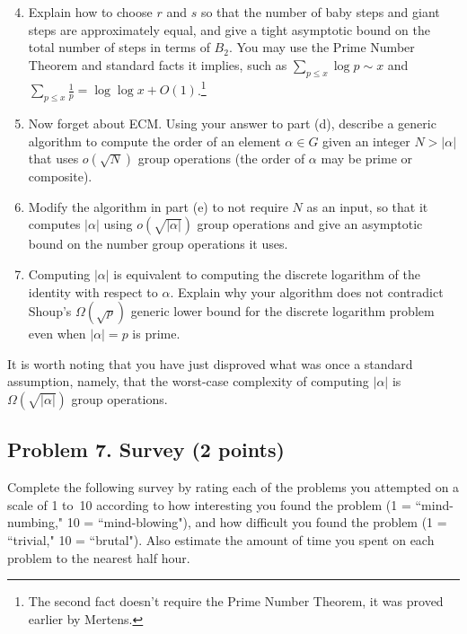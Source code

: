 \documentclass[11pt]{article}
\theoremstyle{definition}
\begin{document}
\begin{enumerate}[{\bf (a)}]
\setcounter{enumi}{3}
\item
Explain how to choose $r$ and $s$ so that the number of baby steps and giant steps are approximately equal, and give a tight asymptotic bound on the total number of steps in terms of $B_2$.  You may use the Prime Number Theorem and standard facts it implies, such as $\sum_{p\le x} \log p \sim x$ and $\sum_{p\le x}\frac{1}{p} = \log\log x + O(1)$.\footnote{The second fact doesn't require the Prime Number Theorem, it was proved earlier by Mertens.}
\item
Now forget about ECM.
Using your answer to part (d), describe a generic algorithm to compute the order of an element $\alpha\in G$ given an integer $N>|\alpha|$ that uses $o(\sqrt{N})$ group operations (the order of $\alpha$ may be prime or composite).  
\item
Modify the algorithm in part (e) to not require $N$ as an input, so that it computes $|\alpha|$ using $o(\sqrt{|\alpha|})$ group operations and give an  asymptotic bound on the number group operations it uses.
\item
Computing $|\alpha|$ is equivalent to computing the discrete logarithm of the identity with respect to $\alpha$.
Explain why your algorithm does not contradict Shoup's $\Omega(\sqrt{p})$ generic lower bound for the discrete logarithm problem even when $|\alpha|=p$ is prime.
\end{enumerate}

It is worth noting that you have just disproved what was once a standard assumption, namely, that the worst-case complexity of computing $|\alpha|$ is $\Omega(\sqrt{|\alpha|})$ group operations.


\subsection*{Problem 7. Survey (2 points)}

Complete the following survey by rating each of the problems you attempted on a scale of 1 to~10 according to how interesting you found the problem (1 = ``mind-numbing," 10 = ``mind-blowing"), and how difficult you found the problem (1 = ``trivial," 10 = ``brutal").  Also estimate the amount of time you spent on each problem to the nearest half hour.
\end{document}
